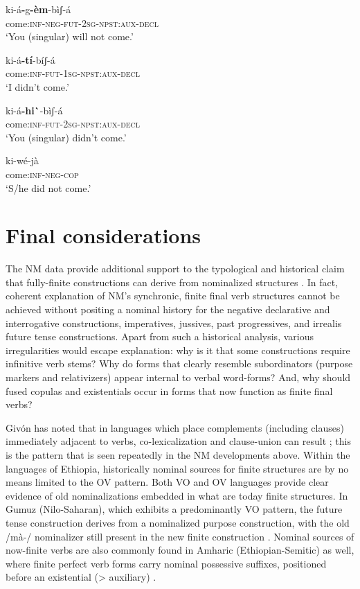 \documentclass[output=paper]{langsci/langscibook}
\begin{document}
\ea\label{ex:mahland:83}
\gll ki-á\textbf{{}-}g\textbf{{}-èm}{}-bìʃ-á     \\
come:\textsc{inf-neg-fut-2sg-npst:aux-decl} \\
\glt `You (singular) will not come.'
\z

\ea\label{ex:mahland:84}
\gll ki-á\textbf{{}-}\textbf{tí}{}-bíʃ-{\downstep}á  \\
come:\textsc{inf-fut-1sg-npst:aux-decl} \\
\glt `I didn't come.'
\z

\ea\label{ex:mahland:85}
\gll ki-á\textbf{{}-hi}\textbf{\`{}}{}-bìʃ-{\downstep}á  \\
come:\textsc{inf-fut-2sg-npst:aux-decl}\\
\glt `You (singular) didn't come.'
\z

\ea\label{ex:mahland:86}
\gll ki-wé-jà\\
come:\textsc{inf-neg-cop}\\
\glt `S/he did not come.'
\z

\section{Final considerations}\label{sec:mahland:4}


The NM data provide additional support to the typological and historical claim that fully-finite constructions can derive from nominalized structures \citep{Gildea1993, Heine1993, Anderson2006, Anderson2011, DeLancey2011}. In fact, coherent explanation of NM's synchronic, finite final verb structures cannot be achieved without positing a nominal history for the negative declarative and interrogative constructions, imperatives, jussives, past progressives, and irrealis future tense constructions. Apart from such a historical analysis, various irregularities would escape explanation: why is it that some constructions require infinitive verb stems? Why do forms that clearly resemble subordinators (purpose markers and relativizers) appear internal to verbal word-forms? And, why should fused copulas and existentials occur in forms that now function as finite final verbs? 


Givón has noted that in languages which place complements (including clauses) immediately adjacent to verbs, co-lexicalization and clause-union can result \citep[74]{Givon2009}; this is the pattern that is seen repeatedly in the NM developments above. Within the languages of Ethiopia, historically nominal sources for finite structures are by no means limited to the OV pattern. Both VO and OV languages provide clear evidence of old nominalizations embedded in what are today finite structures. In Gumuz (Nilo-Saharan), which exhibits a predominantly VO pattern, the future tense construction derives from a nominalized purpose construction, with the old /mà-/ nominalizer still present in the new finite construction \citep[444]{CAhland2012}. Nominal sources of now-finite verbs are also commonly found in Amharic (Ethiopian-Semitic) as well, where finite perfect verb forms carry nominal possessive suffixes, positioned before an existential ({>} auxiliary) \citep[387]{Leslau1995}.  
\end{document}
